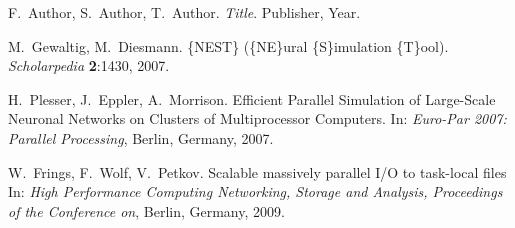 \documentclass[]{YIC2015}
\begin{document}
\begin{thebibliography}{99}

F.~Author, S.~Author, T.~Author. \textit{Title}. Publisher, Year.

M.~Gewaltig, M.~Diesmann. \{NEST\} (\{NE\}ural \{S\}imulation \{T\}ool). \textit{Scholarpedia} %
\textbf{2}:1430, 2007.

H.~Plesser, J.~Eppler, A.~Morrison. Efficient Parallel Simulation of Large-Scale
                  Neuronal Networks on Clusters of Multiprocessor
                  Computers. In: \textit{Euro-Par 2007: Parallel Processing}, Berlin, Germany, 2007.
                  
W.~Frings, F.~Wolf, V.~Petkov. Scalable massively parallel I/O to task-local files
 In: \textit{High Performance Computing Networking, Storage and Analysis, Proceedings of the Conference on}, Berlin, Germany, 2009.


\end{thebibliography}

\end{document}
